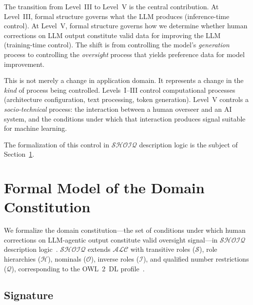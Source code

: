 \documentclass[11pt]{article}
\newcommand{\DL}{\ensuremath{\mathcal{SHOIQ}}\xspace}
\begin{document}
The transition from Level~III to Level~V is the central contribution.
At Level~III, formal structure governs what the LLM produces (inference-time control).
At Level~V, formal structure governs how we determine whether human corrections on LLM output constitute valid data for improving the LLM (training-time control).
The shift is from controlling the model's \emph{generation} process to controlling the \emph{oversight} process that yields preference data for model improvement.

This is not merely a change in application domain.
It represents a change in the \emph{kind} of process being controlled.
Levels~I--III control computational processes (architecture configuration, text processing, token generation).
Level~V controls a \emph{socio-technical} process: the interaction between a human overseer and an AI system, and the conditions under which that interaction produces signal suitable for machine learning.

The formalization of this control in \DL description logic is the subject of Section~\ref{sec:formal}.


\section{Formal Model of the Domain Constitution}
\label{sec:formal}

We formalize the domain constitution---the set of conditions under which human corrections on LLM-agentic output constitute valid oversight signal---in \DL description logic~\citep{baader2003description}.
\DL extends $\mathcal{ALC}$ with transitive roles ($\mathcal{S}$), role hierarchies ($\mathcal{H}$), nominals ($\mathcal{O}$), inverse roles ($\mathcal{I}$), and qualified number restrictions ($\mathcal{Q}$), corresponding to the OWL~2~DL profile~\citep{grau2008owl2}.

\subsection{Signature}
\label{sec:signature}
\end{document}
